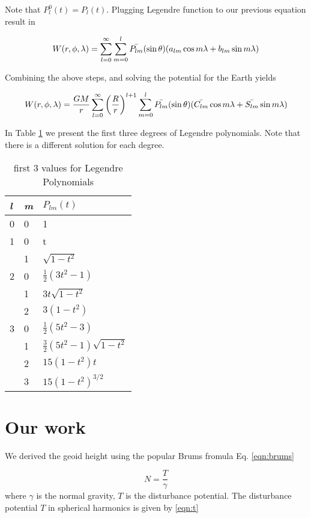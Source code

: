 Note that $P_l^0(t) = P_l(t)$. Plugging Legendre function to our previous equation result in

\begin{equation}
	W(r, \phi, \lambda) = \sum_{l=0}^{\infty}\sum_{m=0}^{l}\bar{P_{lm}}(\sin \theta)(a_{lm} \cos m \lambda \\
	+ b_{lm} \sin m \lambda)
\end{equation}

Combining the above steps, and solving the potential for the Earth yields

\begin{equation}
W(r, \phi, \lambda) = \frac{GM}{r}\sum_{l=0}^{\infty}\left(\frac{R}{r}\right)^{l+1}\sum_{m=0}^{l}\bar{P_{lm}}(\sin \theta)(\bar{C_{lm}} \cos m \lambda \\
+ \bar{S_{lm}} \sin m \lambda)
\end{equation}

In Table \ref{table:alfs} we present the first three degrees of Legendre polynomials. Note that there is a different solution for each degree.
 \begin{table}[]
 	\centering
 	\caption{first 3 values for Legendre Polynomials}
 	\label{table:alfs}
 	\begin{tabular}{@{}lll@{}}
 		\toprule
 		\emph{l} & \emph{m} & $P_{lm}(t)$\\ \midrule
 		0 & 0 & 1\\
 		1 & 0 & t \\
 		& 1 & $\sqrt{1-t^2}$\\
 		2 & 0 & $\tfrac{1}{2}(3t^2-1)$\\
 		& 1 & $3t\sqrt{1-t^2}$\\
 		& 2 & $3(1-t^2)$\\
 		3 & 0 & $\tfrac{1}{2}(5t^2-3)$\\
 		& 1 & $\tfrac{3}{2}(5t^2-1)\sqrt{1-t^2}$\\
 		& 2 & $15(1-t^2)t$\\
 		& 3 & $15(1-t^2)^{3/2}$\\  \bottomrule
 		
 	\end{tabular}
 \end{table}
 
 \section{Our work}
 We derived the geoid height using the popular Brums fromula Eq. \ref{eqn:brums}
 
 \begin{equation}
 \label{eqn:brums}
 N = \frac{T}{\gamma}
 \end{equation}
 where $\gamma$ is the normal gravity, $T$ is the disturbance potential. The disturbance potential $T$ in spherical harmonics is given by \ref{eqn:t}
 
